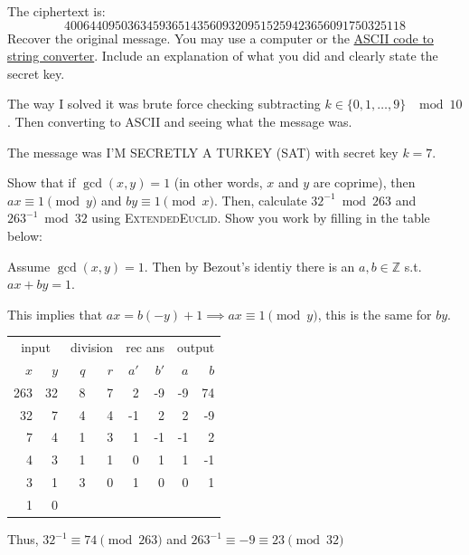 \documentclass[12pt, letterpaper]{article}
\newcommand{\Z}{\mathbb{Z}}
\begin{document}
\begin{subproblem}{}
    The ciphertext is:
    \[ 400644095036345936514356093209515259423656091750325118
    \]
    Recover the original message. You may use a computer or the \href{https://onlinestringtools.com/convert-ascii-to-string}{ASCII code to string converter}. Include an explanation of what you did and clearly state the secret key.
\end{subproblem}
\begin{problemproof}
    The way I solved it was brute force checking subtracting $k \in \{0,1,\dots,9\}$ $\mod 10$. Then converting to ASCII and seeing what the message was.

    The message was I'M SECRETLY A TURKEY (SAT) with secret key $k=7$.
\end{problemproof}

\begin{subproblem}{}
    Show that if $\gcd(x,y) = 1$ (in other words, $x$ and $y$ are coprime), then $ax \equiv 1 \pmod y$ and $by \equiv 1 \pmod x$. Then, calculate $32^{-1} \bmod 263$ and $263^{-1} \bmod {32}$ using \textsc{ExtendedEuclid}. Show you work by filling in the table below:
\end{subproblem}
\begin{problemproof}
    Assume $\gcd(x,y)=1$. Then by Bezout's identiy there is an $a,b \in \Z$ s.t. $ax+by=1$.

    This implies that $ax=b(-y)+1 \implies ax \equiv 1 \pmod{y}$, this is the same for $by$.

    \begin{table}[H]\centering
        \begin{tabular}{rr|rr|rr|rr}
          \multicolumn{2}{c|}{input} & \multicolumn{2}{|c|}{division} & \multicolumn{2}{|c|}{rec ans} & \multicolumn{2}{|c}{output} \\
           $x$   & $y$  & $q$ & $r$  & $a'$ & $b'$ & $a$ & $b$  \\ \hline
           263   & 32   &  8  &  7   &  2  &  -9   & -9  &  74   \\
           32    &  7   &  4  &  4   & -1  &   2   &  2  & -9   \\
           7     &  4   &  1  &  3   &  1  &  -1   & -1  &  2   \\
           4     &  3   &  1  &  1   &  0  &   1   &  1  & -1   \\
           3     &  1   &  3  &  0   &  1  &   0   &  0  &  1   \\
           1     &  0   &     &      &     &       &     &      \\
        \end{tabular}
      \end{table}

      Thus, $32^{-1} \equiv 74 \pmod{263}$ and $263^{-1} \equiv -9 \equiv 23\pmod{32}$
\end{problemproof}
\end{document}
